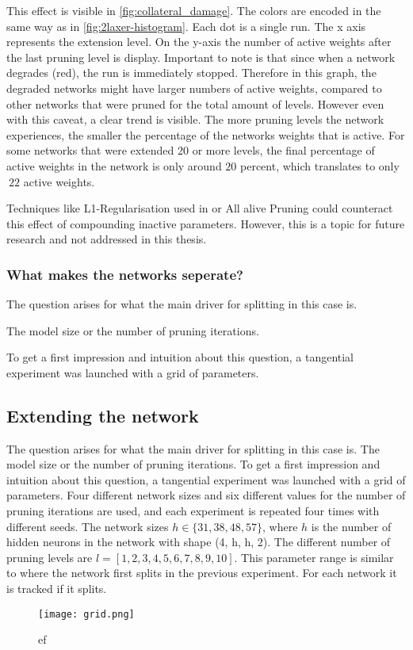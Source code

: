 This effect is visible in \ref{fig:collateral_damage}.
The colors are encoded in the same way as in \ref{fig:2laxer-histogram}.
Each dot is a single run. 
The x axis represents the extension level.
On the y-axis the number of active weights after the last pruning level is display.
Important to note is that since when a network degrades (red), the run is immediately stopped.
Therefore in this graph, the degraded networks might have larger numbers of active weights, compared to other networks that were pruned for the total amount of levels.
However even with this caveat, a clear trend is visible.
The more pruning levels the network experiences, the smaller the percentage of the networks weights that is active.
For some networks that were extended 20 or more levels, the final percentage of active weights in the network is only around $20$ percent, which translates to only $~22$ active weights.

Techniques like L1-Regularisation used in \autocite{HanEtAl15} or All alive Pruning \autocite{AllAlivePruning} could counteract this effect of compounding inactive parameters.
However, this is a topic for future research and not addressed in this thesis. 

\subsubsection{What makes the networks seperate?}
The question arises for what the main driver for splitting in this case is.

The model size or the number of pruning iterations.

To get a first impression and intuition about this question, a tangential experiment was launched with a grid of parameters.




\subsection{Extending the network}

The question arises for what the main driver for splitting in this case is.
The model size or the number of pruning iterations.
To get a first impression and intuition about this question, a tangential experiment was launched with a grid of parameters.
Four different network sizes and six different values for the number of pruning iterations are used, and each experiment is repeated four times with different seeds.
The network sizes $h \in \{31, 38, 48, 57\}$, where $h$ is the number of hidden neurons in the network with shape (4, h, h, 2).
The different number of pruning levels are $l = [1, 2, 3, 4, 5, 6, 7, 8, 9, 10]$.
This parameter range is similar to where the network first splits in the previous experiment.
For each network it is tracked if it splits.
\begin{figure}[ht]
    \centering
    \texttt{[image: grid.png]}
    \caption{ef}
    \label{fig:grid}
\end{figure}

